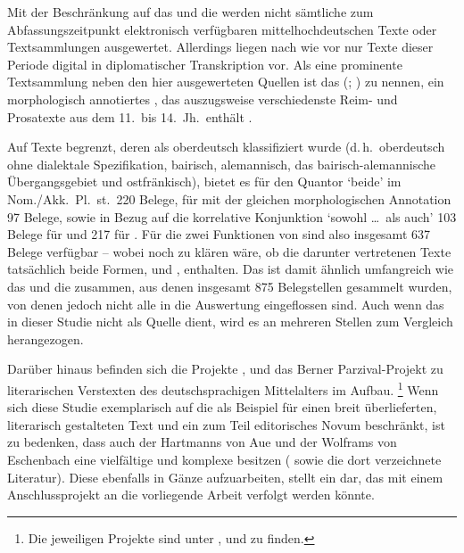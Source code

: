 Mit der Beschränkung auf das \CAO{} und die \KC{} werden nicht
sämtliche zum Abfassungszeitpunkt elektronisch verfügbaren
mittelhochdeutschen Texte oder Textsammlungen
ausgewertet. Allerdings liegen nach wie vor nur Texte dieser Periode digital in
diplomatischer Transkription vor. Als eine prominente
Textsammlung neben den hier ausgewerteten Quellen ist das 
(\REM; \cite{rem}) zu nennen, ein morphologisch annotiertes , das
auszugsweise verschiedenste Reim- und Prosatexte aus dem
11.\ bis 14.~Jh.\ enthält \autocite[siehe auch][]{wegera2000}.

Auf Texte begrenzt, deren  als oberdeutsch
klassifiziert wurde (d.\,h.\ oberdeutsch ohne dialektale
Spezifikation, bairisch, alemannisch, das
bai\-risch-alemannische
Übergangsgebiet und ostfränkisch), bietet es
für den Quantor  `beide' im Nom./Akk.~Pl.~st.\ 220 Belege, für
 mit der gleichen morphologischen Annotation 97
Belege, sowie in Bezug auf die korrelative Konjunktion 
`sowohl \dots\ als auch' 103 Belege für  und 217 für .
Für die zwei Funktionen von  sind also insgesamt 637 Belege
verfügbar -- wobei noch zu klären wäre, ob die darunter vertretenen Texte
tatsächlich beide Formen,  und , enthalten. Das \REM{}
ist damit ähnlich umfangreich wie das \CAO{} und die \KC{} zusammen, aus denen
insgesamt 875 Belegstellen gesammelt wurden, von denen jedoch nicht alle in die
Auswertung eingeflossen sind. Auch wenn das \REM{} in dieser Studie nicht als
Quelle dient, wird es an mehreren Stellen zum Vergleich herangezogen.

Darüber hinaus befinden sich die Projekte 
\autocite{iwdigital},  \autocite{ldmdigital} und das
Berner Parzival-Projekt \autocite{parzivalprojekt} zu literarischen Verstexten
des deutschsprachigen Mittelalters im Aufbau.%
%
	\footnote{Die jeweiligen Projekte sind unter ,
	 und  zu finden.}
%
Wenn sich diese Studie exemplarisch auf die \KC{} als Beispiel für einen breit
überlieferten, literarisch gestalteten Text und ein zum Teil editorisches Novum
beschränkt, ist zu bedenken, dass auch der  Hartmanns von
Aue und der  Wolframs von
Eschenbach eine vielfältige und komplexe
 besitzen (\cite[vgl.][s.\,v.~\textit{: }, \textit{: }]{hsc}
sowie die dort verzeichnete Literatur). Diese ebenfalls in Gänze aufzuarbeiten,
stellt ein  dar, das mit einem Anschlussprojekt an die
vorliegende Arbeit verfolgt werden könnte.

